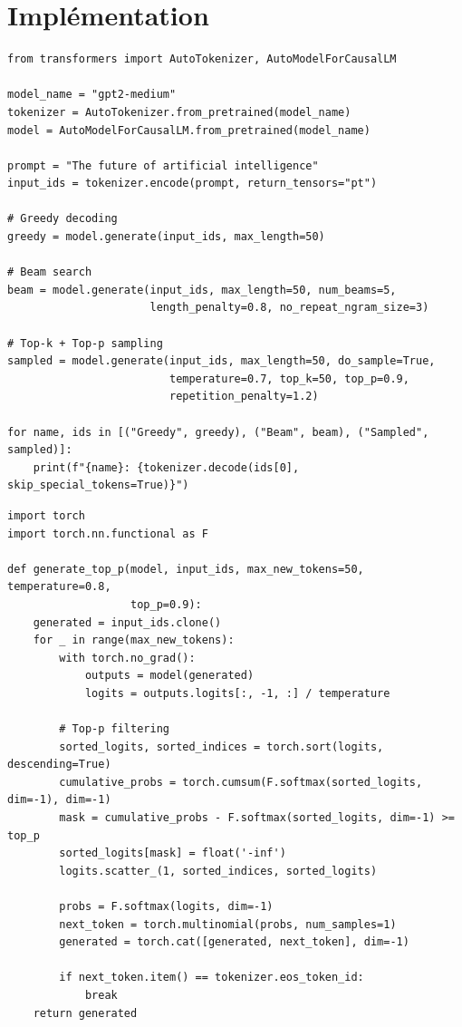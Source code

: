 \section{Impl\'ementation}
\label{sec:gen:implementation}

\begin{codeblock}[title=\textbf{Strat\'egies de d\'ecodage avec Hugging Face}]
\begin{verbatim}
from transformers import AutoTokenizer, AutoModelForCausalLM

model_name = "gpt2-medium"
tokenizer = AutoTokenizer.from_pretrained(model_name)
model = AutoModelForCausalLM.from_pretrained(model_name)

prompt = "The future of artificial intelligence"
input_ids = tokenizer.encode(prompt, return_tensors="pt")

# Greedy decoding
greedy = model.generate(input_ids, max_length=50)

# Beam search
beam = model.generate(input_ids, max_length=50, num_beams=5,
                      length_penalty=0.8, no_repeat_ngram_size=3)

# Top-k + Top-p sampling
sampled = model.generate(input_ids, max_length=50, do_sample=True,
                         temperature=0.7, top_k=50, top_p=0.9,
                         repetition_penalty=1.2)

for name, ids in [("Greedy", greedy), ("Beam", beam), ("Sampled", sampled)]:
    print(f"{name}: {tokenizer.decode(ids[0], skip_special_tokens=True)}")
\end{verbatim}
\end{codeblock}

\begin{codeblock}[title=\textbf{D\'ecodage pas \`a pas}]
\begin{verbatim}
import torch
import torch.nn.functional as F

def generate_top_p(model, input_ids, max_new_tokens=50, temperature=0.8,
                   top_p=0.9):
    generated = input_ids.clone()
    for _ in range(max_new_tokens):
        with torch.no_grad():
            outputs = model(generated)
            logits = outputs.logits[:, -1, :] / temperature

        # Top-p filtering
        sorted_logits, sorted_indices = torch.sort(logits, descending=True)
        cumulative_probs = torch.cumsum(F.softmax(sorted_logits, dim=-1), dim=-1)
        mask = cumulative_probs - F.softmax(sorted_logits, dim=-1) >= top_p
        sorted_logits[mask] = float('-inf')
        logits.scatter_(1, sorted_indices, sorted_logits)

        probs = F.softmax(logits, dim=-1)
        next_token = torch.multinomial(probs, num_samples=1)
        generated = torch.cat([generated, next_token], dim=-1)

        if next_token.item() == tokenizer.eos_token_id:
            break
    return generated
\end{verbatim}
\end{codeblock}


